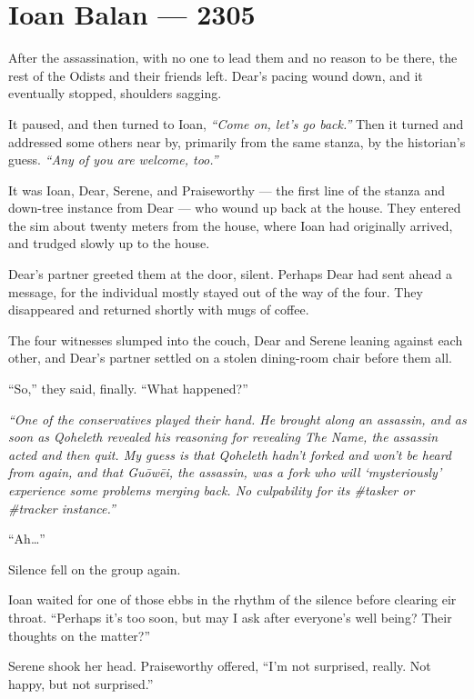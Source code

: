 \hypertarget{ioan-balan-2305}{%
\chapter*{Ioan Balan — 2305}\label{ioan-balan-2305}}

After the assassination, with no one to lead them and no reason to be there, the rest of the Odists and their friends left. Dear's pacing wound down, and it eventually stopped, shoulders sagging.

It paused, and then turned to Ioan, \emph{``Come on, let's go back.''} Then it turned and addressed some others near by, primarily from the same stanza, by the historian's guess. \emph{``Any of you are welcome, too.''}

It was Ioan, Dear, Serene, and Praiseworthy — the first line of the stanza and down-tree instance from Dear — who wound up back at the house. They entered the sim about twenty meters from the house, where Ioan had originally arrived, and trudged slowly up to the house.

Dear's partner greeted them at the door, silent. Perhaps Dear had sent ahead a message, for the individual mostly stayed out of the way of the four. They disappeared and returned shortly with mugs of coffee.

The four witnesses slumped into the couch, Dear and Serene leaning against each other, and Dear's partner settled on a stolen dining-room chair before them all.

``So,'' they said, finally. ``What happened?''

\emph{``One of the conservatives played their hand. He brought along an assassin, and as soon as Qoheleth revealed his reasoning for revealing The Name, the assassin acted and then quit. My guess is that Qoheleth hadn't forked and won't be heard from again, and that Guōwēi, the assassin, was a fork who will `mysteriously' experience some problems merging back. No culpability for its \#tasker or \#tracker instance.''}

``Ah\ldots{}''

Silence fell on the group again.

Ioan waited for one of those ebbs in the rhythm of the silence before clearing eir throat. ``Perhaps it's too soon, but may I ask after everyone's well being? Their thoughts on the matter?''

Serene shook her head. Praiseworthy offered, ``I'm not surprised, really. Not happy, but not surprised.''

